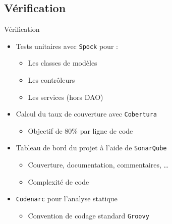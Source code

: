 \subsection{Vérification}
\begin{frame}{Vérification}
	\begin{itemize}
		\item Tests unitaires avec \texttt{Spock} pour : 
		\begin{itemize}
			\item Les classes de modèles
			\item Les contrôleurs
			\item Les services (hors DAO)
		\end{itemize}
		\vfill
		\item Calcul du taux de couverture avec \texttt{Cobertura} 
		\begin{itemize}
			\item Objectif de 80\% par ligne de code
		\end{itemize}
				\vfill
		\item Tableau de bord du projet à l'aide de \texttt{SonarQube}
		\begin{itemize}
			\item Couverture, documentation, commentaires, \ldots 
			\item Complexité de code
		\end{itemize}
				\vfill
		\item \texttt{Codenarc} pour l'analyse statique 
		\begin{itemize}
			\item Convention de codage standard \texttt{Groovy}
		\end{itemize}
	\end{itemize}
\end{frame}

\SteveSpeak

